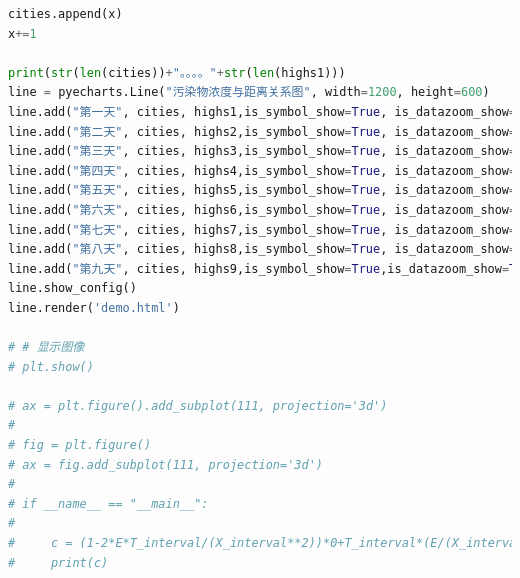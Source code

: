 \documentclass{whutmod}
\begin{document}
\begin{lstlisting}[language=python]
cities.append(x)
x+=1

print(str(len(cities))+"。。。。"+str(len(highs1)))
line = pyecharts.Line("污染物浓度与距离关系图", width=1200, height=600)
line.add("第一天", cities, highs1,is_symbol_show=True, is_datazoom_show=True)
line.add("第二天", cities, highs2,is_symbol_show=True, is_datazoom_show=True)
line.add("第三天", cities, highs3,is_symbol_show=True, is_datazoom_show=True)
line.add("第四天", cities, highs4,is_symbol_show=True, is_datazoom_show=True)
line.add("第五天", cities, highs5,is_symbol_show=True, is_datazoom_show=True)
line.add("第六天", cities, highs6,is_symbol_show=True, is_datazoom_show=True)
line.add("第七天", cities, highs7,is_symbol_show=True, is_datazoom_show=True)
line.add("第八天", cities, highs8,is_symbol_show=True, is_datazoom_show=True)
line.add("第九天", cities, highs9,is_symbol_show=True,is_datazoom_show=True)
line.show_config()
line.render('demo.html')

# # 显示图像
# plt.show()

# ax = plt.figure().add_subplot(111, projection='3d')
#
# fig = plt.figure()
# ax = fig.add_subplot(111, projection='3d')
#
# if __name__ == "__main__":
#
#     c = (1-2*E*T_interval/(X_interval**2))*0+T_interval*(E/(X_interval**2)-u/(2*X_interval))*0+T_interval*(E/(X_interval**2)+u/(2*X_interval))
#     print(c)
\end{lstlisting}
\end{document}
